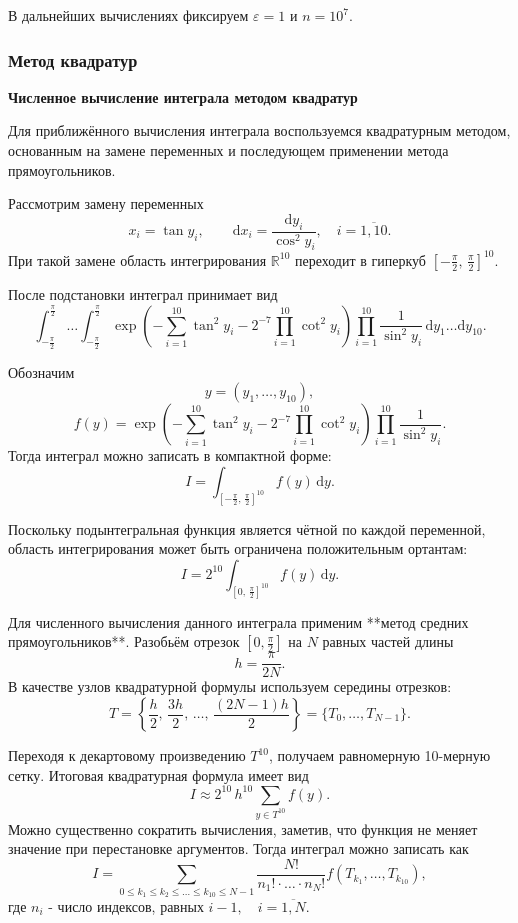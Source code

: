 \documentclass[11pt]{article}
\renewcommand{\le}{\leqslant}
\begin{document}
В дальнейших вычислениях фиксируем $\varepsilon=1$ и $n=10^7$.


\subsubsection{Метод квадратур}


\textbf{Численное вычисление интеграла методом квадратур}

Для приближённого вычисления интеграла воспользуемся квадратурным методом, основанным на замене переменных и последующем применении метода прямоугольников.

Рассмотрим замену переменных
$$
x_i = \tan y_i,\qquad
\mathrm dx_i = \frac{\mathrm dy_i}{\cos^2 y_i},
\quad i=\overline{1,10}.
$$
При такой замене область интегрирования $\mathbb R^{10}$ переходит в гиперкуб
$[-\tfrac{\pi}{2},\,\tfrac{\pi}{2}]^{10}$.

После подстановки интеграл принимает вид
$$
\int_{-\frac{\pi}{2}}^{\frac{\pi}{2}}\!\!\dots
\int_{-\frac{\pi}{2}}^{\frac{\pi}{2}}
\exp\!\left(
-\sum_{i=1}^{10}\tan^2 y_i
-2^{-7}\prod_{i=1}^{10}\cot^2 y_i
\right)
\prod_{i=1}^{10}\frac{1}{\sin^2 y_i}\,
\mathrm dy_1\dots \mathrm dy_{10}.
$$

Обозначим
$$
y=(y_1,\dots,y_{10}),
$$
$$
f(y)=
\exp\!\left(
-\sum_{i=1}^{10}\tan^2 y_i
-2^{-7}\prod_{i=1}^{10}\cot^2 y_i
\right)
\prod_{i=1}^{10}\frac{1}{\sin^2 y_i}.
$$
Тогда интеграл можно записать в компактной форме:
$$
I=\int_{[-\frac{\pi}{2},\,\frac{\pi}{2}]^{10}} f(y)\,\mathrm dy.
$$

Поскольку подынтегральная функция является чётной по каждой переменной, область интегрирования может быть ограничена положительным ортантам:
$$
I = 2^{10}\int_{[0,\,\frac{\pi}{2}]^{10}} f(y)\,\mathrm dy.
$$

Для численного вычисления данного интеграла применим **метод средних прямоугольников**. Разобьём отрезок $[0,\tfrac{\pi}{2}]$ на $N$ равных частей длины
$$
h=\frac{\pi}{2N}.
$$
В качестве узлов квадратурной формулы используем середины отрезков:
$$
T=\left\{\frac{h}{2},\,\frac{3h}{2},\,\dots,\,\frac{(2N-1)h}{2}\right\}
=\{T_0,\dots,T_{N-1}\}.
$$

Переходя к декартовому произведению $T^{10}$, получаем равномерную 10-мерную сетку. Итоговая квадратурная формула имеет вид
$$
I \approx 2^{10}\,h^{10}\sum_{y\in T^{10}} f(y).
$$
Можно существенно сократить вычисления, заметив, что функция не меняет значение при перестановке аргументов. Тогда интеграл можно записать как
$$
    I = \sum_{0 \le k_1 \le k_2 \le \dots \le k_{10} \le N-1} \frac{N!}{n_1!\cdot \dots \cdot n_{N}!} f(T_{k_1}, \dots, T_{k_{10}}),
$$
где $n_i$ - число индексов, равных $i - 1, \quad i = \overline{1, N}$.
\\
\end{document}
